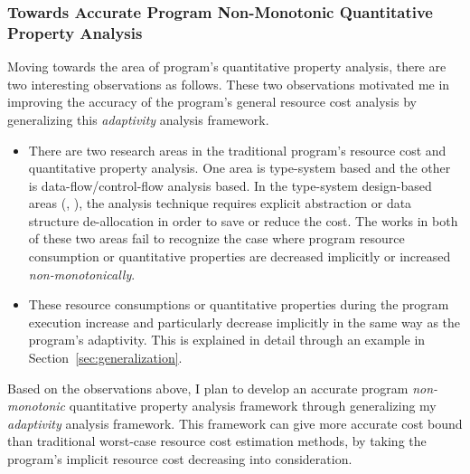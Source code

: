\subsubsection{Towards Accurate Program Non-Monotonic Quantitative Property Analysis}
\label{subsec:intro-cost}
Moving towards the area of program's quantitative property analysis,
there are two interesting observations as follows.
These two observations motivated me in 
improving the accuracy of the program's general resource cost analysis
by generalizing this \emph{adaptivity} analysis framework.
\begin{itemize}
 \item 
 There are two research areas in the traditional program's resource cost and quantitative property analysis.
One area is type-system based and the other is data-flow/control-flow analysis based. 
In the type-system design-based areas (\cite{GustafssonEL05}, \cite{hoffmann_jost_2022}), 
the analysis technique requires explicit abstraction or data structure de-allocation in order to save or reduce the cost.
 The
 works in both of these two areas fail to recognize the case where program resource consumption or quantitative properties 
 are decreased implicitly or increased \emph{non-monotonically}.
 \item These resource consumptions or quantitative properties during the program 
 execution increase and particularly decrease implicitly in the same way as the program's adaptivity. 
 This is explained in detail through an example in Section~\ref*{sec:generalization}.
\end{itemize}
 Based on the observations above, 
 I plan to develop
 an accurate program \emph{non-monotonic} quantitative property analysis framework through generalizing 
 my \emph{adaptivity} analysis framework.
 This framework can give more accurate cost bound than traditional worst-case resource cost estimation methods,
 by taking the program's implicit resource cost decreasing into consideration.

